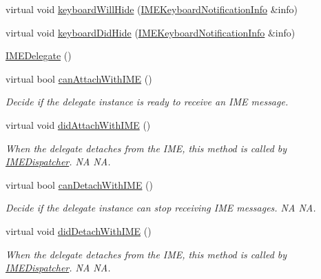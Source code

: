 \begin{DoxyCompactItemize}
virtual void \hyperlink{classIMEDelegate_a576cd6b268dfab44836f74183cb76f06}{keyboard\+Will\+Hide} (\hyperlink{structIMEKeyboardNotificationInfo}{I\+M\+E\+Keyboard\+Notification\+Info} \&info)
\item 
virtual void \hyperlink{classIMEDelegate_a801b9cec4447e0f6418eae247afb7c72}{keyboard\+Did\+Hide} (\hyperlink{structIMEKeyboardNotificationInfo}{I\+M\+E\+Keyboard\+Notification\+Info} \&info)
\item 
\hyperlink{classIMEDelegate_a9ca3d55ba2d6d1c3edbb3a6dba84f345}{I\+M\+E\+Delegate} ()
\item 
virtual bool \hyperlink{classIMEDelegate_aa9e6c77460b633214759a779c16767f6}{can\+Attach\+With\+I\+ME} ()
\begin{DoxyCompactList}\small\item\em Decide if the delegate instance is ready to receive an I\+ME message. \end{DoxyCompactList}\item 
\mbox{\label{classIMEDelegate_a2eda6a016024c1b14d58e19df6d269fb}} 
virtual void \hyperlink{classIMEDelegate_a2eda6a016024c1b14d58e19df6d269fb}{did\+Attach\+With\+I\+ME} ()
\begin{DoxyCompactList}\small\item\em When the delegate detaches from the I\+ME, this method is called by \hyperlink{classIMEDispatcher}{I\+M\+E\+Dispatcher}.  NA  NA. \end{DoxyCompactList}\item 
\mbox{\label{classIMEDelegate_a033e4ac8009c60cd41bf73430682fcb4}} 
virtual bool \hyperlink{classIMEDelegate_a033e4ac8009c60cd41bf73430682fcb4}{can\+Detach\+With\+I\+ME} ()
\begin{DoxyCompactList}\small\item\em Decide if the delegate instance can stop receiving I\+ME messages.  NA  NA. \end{DoxyCompactList}\item 
\mbox{\label{classIMEDelegate_a6d8edd36c2380852f6b1fa6cf58c1879}} 
virtual void \hyperlink{classIMEDelegate_a6d8edd36c2380852f6b1fa6cf58c1879}{did\+Detach\+With\+I\+ME} ()
\begin{DoxyCompactList}\small\item\em When the delegate detaches from the I\+ME, this method is called by \hyperlink{classIMEDispatcher}{I\+M\+E\+Dispatcher}.  NA  NA. \end{DoxyCompactList}\item 

\end{DoxyCompactItemize}

